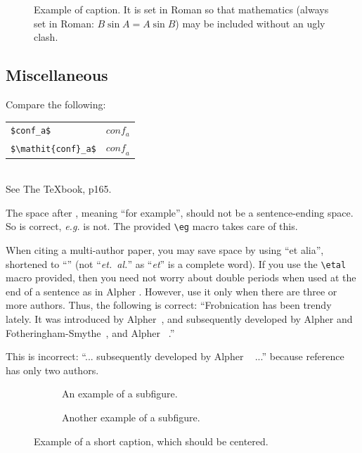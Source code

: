 \begin{figure}[t]
  \centering
  \fbox{\rule{0pt}{2in} \rule{0.9\linewidth}{0pt}}

   \caption{Example of caption.
   It is set in Roman so that mathematics (always set in Roman: $B \sin A = A \sin B$) may be included without an ugly clash.}
   \label{fig:onecol}
\end{figure}

\subsection{Miscellaneous}

\noindent
Compare the following:\\
\begin{tabular}{ll}
 \verb'$conf_a$' &  $conf_a$ \\
 \verb'$\mathit{conf}_a$' & $\mathit{conf}_a$
\end{tabular}\\
See The \TeX book, p165.

The space after \eg, meaning ``for example'', should not be a sentence-ending space.
So \eg is correct, {\em e.g.} is not.
The provided \verb'\eg' macro takes care of this.

When citing a multi-author paper, you may save space by using ``et alia'', shortened to ``\etal'' (not ``{\em et.\ al.}'' as ``{\em et}'' is a complete word).
If you use the \verb'\etal' macro provided, then you need not worry about double periods when used at the end of a sentence as in Alpher \etal.
However, use it only when there are three or more authors.
Thus, the following is correct:
   ``Frobnication has been trendy lately.
   It was introduced by Alpher~\cite{Alpher02}, and subsequently developed by
   Alpher and Fotheringham-Smythe~\cite{Alpher03}, and Alpher \etal~\cite{Alpher04}.''

This is incorrect: ``... subsequently developed by Alpher \etal~\cite{Alpher03} ...'' because reference~\cite{Alpher03} has only two authors.

\begin{figure}
  \centering
  \begin{subfigure}{0.68\linewidth}
    \fbox{\rule{0pt}{2in} \rule{.9\linewidth}{0pt}}
    \caption{An example of a subfigure.}
    \label{fig:short-a}
  \end{subfigure}
  \hfill
  \begin{subfigure}{0.28\linewidth}
    \fbox{\rule{0pt}{2in} \rule{.9\linewidth}{0pt}}
    \caption{Another example of a subfigure.}
    \label{fig:short-b}
  \end{subfigure}
  \caption{Example of a short caption, which should be centered.}
  \label{fig:short}
\end{figure}

